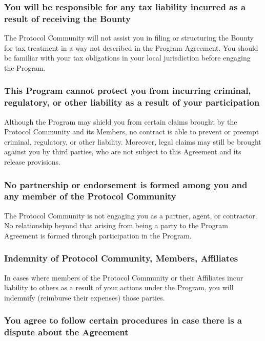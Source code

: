 \subsubsection*{You will be responsible for any tax liability incurred as a result of receiving the Bounty}\label{exhibit:e:tax_liability}

The Protocol Community will not assist you in filing or structuring the Bounty for tax treatment in a way not described in the Program Agreement. You should be familiar with your tax obligations in your local jurisdiction before engaging the Program.

\subsubsection*{This Program cannot protect you from incurring criminal, regulatory, or other liability as a result of your participation}\label{exhibit:e:liability_limits}

Although the Program may shield you from certain claims brought by the Protocol Community and its Members, no contract is able to prevent or preempt criminal, regulatory, or other liability. Moreover, legal claims may still be brought against you by third parties, who are not subject to this Agreement and its release provisions.

\subsubsection*{No partnership or endorsement is formed among you and any member of the Protocol Community}\label{exhibit:e:no_partnership}

The Protocol Community is not engaging you as a partner, agent, or contractor. No relationship beyond that arising from being a party to the Program Agreement is formed through participation in the Program.

\subsubsection*{Indemnity of Protocol Community, Members, Affiliates}\label{exhibit:e:indemnity}

In cases where members of the Protocol Community or their Affiliates incur liability to others as a result of your actions under the Program, you will indemnify (reimburse their expenses) those parties.

\subsubsection*{You agree to follow certain procedures in case there is a dispute about the Agreement}\label{exhibit:e:dispute_agreement}


